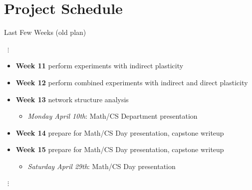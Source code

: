 \section{Project Schedule}


\begin{frame}{Last Few Weeks (old plan)}
\begin{center}
{\centering ~$\bm{\vdots}$~}
\end{center}
\begin{itemize}
  \item \textbf{Week 11} perform experiments with indirect plasticity
  \item \textbf{Week 12} perform combined experiments with indirect and direct plasticity
  \item \textbf{Week 13} network structure analysis
  \begin{itemize}
    \item \textit{Monday April 10th}: Math/CS Department presentation
  \end{itemize}
  \item \textbf{Week 14} prepare for Math/CS Day presentation, capstone writeup
  \item \textbf{Week 15} prepare for Math/CS Day presentation, capstone writeup
  \begin{itemize}
  	\item \textit{Saturday April 29th}: Math/CS Day presentation
  \end{itemize}
 \end{itemize}
\vspace{-1ex}
\begin{center}
{\centering ~$\bm{\vdots}$~}
\end{center}
\end{frame}

